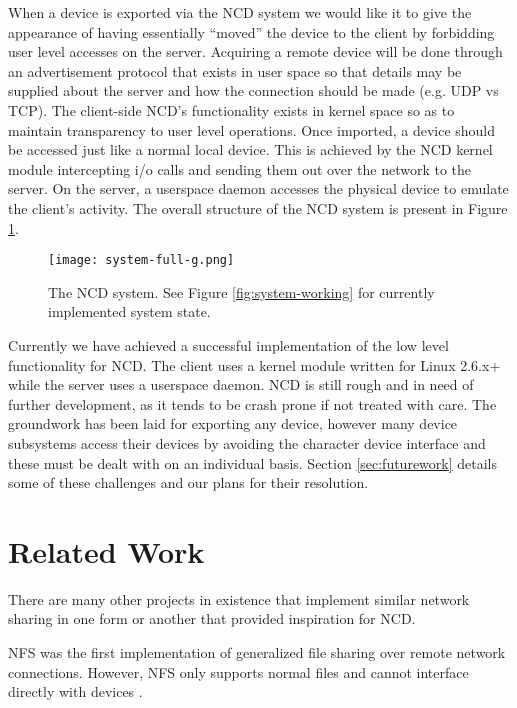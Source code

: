 \documentclass[11pt,twocolumn]{article}
\begin{document}
When a device is exported via the NCD system we would like it to give the
appearance of having essentially ``moved'' the device to the client 
by forbidding user level accesses on the server.
Acquiring a remote device will be
done through an advertisement protocol that exists in user space so
that details may be supplied about the server and how the connection
should be made (e.g. UDP vs TCP).  The client-side NCD's functionality
exists in kernel space so as to maintain transparency to
user level operations. Once imported, a device should be accessed just
like a normal local device.  This is achieved by the NCD kernel module
intercepting i/o calls and sending them out over the network to the
server. On the server, a userspace daemon accesses the physical
device to emulate the client's activity. The overall structure of the
NCD system is present in Figure \ref{fig:system-full}.

\begin{figure}[h]
  \centering
  \texttt{[image: system-full-g.png]}
  \caption{The NCD system. See Figure \ref{fig:system-working}
    for currently implemented system state.}
  \label{fig:system-full}
\end{figure}

Currently we have achieved a successful implementation of the low
level functionality for NCD. The client uses a kernel module written
for Linux 2.6.x+ while the server uses a userspace daemon. NCD is
still rough and in need of further development, as it tends to be
crash prone if not treated with care. The groundwork has been laid for
exporting any device, however many device subsystems access their
devices by avoiding the character device interface and these must be
dealt with on an individual basis. Section \ref{sec:futurework}
details some of these challenges and our plans for their resolution.

\section{Related Work}
\label{sec:relatedwork}

There are many other projects in existence that implement similar
network sharing in one form or another that provided inspiration for
NCD.

NFS was the first implementation of generalized file sharing
over remote network connections.  However, NFS only supports normal
files and cannot interface directly with devices \cite{nfs-source}.
\end{document}
